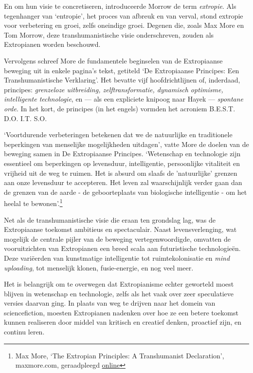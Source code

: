 \documentclass[
  a5paper,
  smalldemyvopaper,11pt,twoside,onecolumn,openright,extrafontsizes]{memoir}
\begin{document}
En om hun visie te concretiseren, introduceerde Morrow de term
\emph{extropie}. Als tegenhanger van `entropie', het proces van afbreuk
en van verval, stond extropie voor verbetering en groei, zelfs oneindige
groei. Degenen die, zoals Max More en Tom Morrow, deze
transhumanistische visie onderschreven, zouden als Extropianen worden
beschouwd.

Vervolgens schreef More de fundamentele beginselen van de Extropiaanse
beweging uit in enkele pagina's tekst, getiteld `De Extropiaanse
Principes: Een Transhumanistische Verklaring'. Het bevatte vijf
hoofdrichtlijnen of, inderdaad, principes: \emph{grenzeloze uitbreiding,
zelftransformatie, dynamisch optimisme, intelligente technologie}, en
--- als een expliciete knipoog naar Hayek --- \emph{spontane orde}. In
het kort, de principes (in het engels) vormden het acroniem B.E.S.T.
D.O. I.T. S.O.

`Voortdurende verbeteringen betekenen dat we de natuurlijke en
traditionele beperkingen van menselijke mogelijkheden uitdagen', vatte
More de doelen van de beweging samen in De Extropiaanse Principes.
`Wetenschap en technologie zijn essentieel om beperkingen op levensduur,
intelligentie, persoonlijke vitaliteit en vrijheid uit de weg te ruimen.
Het is absurd om slaafs de 'natuurlijke' grenzen aan onze levensduur te
accepteren. Het leven zal waarschijnlijk verder gaan dan de grenzen van
de aarde - de geboorteplaats van biologische intelligentie - om het
heelal te bewonen'.\footnote{Max More, `The Extropian Principles: A
  Transhumanist Declaration', maxmore.com, geraadpleegd
  \href{https://web.archive.org/web/20090130143449/https://www.maxmore.com/extprn3.htm}{online}}

Net als de transhumanistische visie die eraan ten grondslag lag, was de
Extropiaanse toekomst ambitieus en spectaculair. Naast levensverlenging,
wat mogelijk de centrale pijler van de beweging vertegenwoordigde,
omvatten de vooruitzichten van Extropianen een breed scala aan
futuristische technologieën. Deze variëerden van kunstmatige
intelligentie tot ruimtekolonisatie en \emph{mind uploading}, tot
menselijk klonen, fusie-energie, en nog veel meer.

Het is belangrijk om te overwegen dat Extropianisme echter geworteld
moest blijven in wetenschap en technologie, zelfs als het vaak over zeer
speculatieve versies daarvan ging. In plaats van weg te drijven naar het
domein van sciencefiction, moesten Extropianen nadenken over hoe ze een
betere toekomst kunnen realiseren door middel van kritisch en creatief
denken, proactief zijn, en continu leren.
\end{document}
